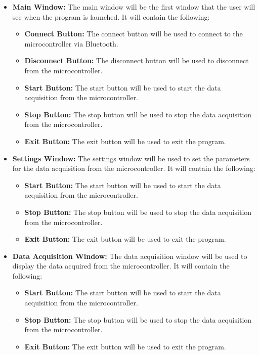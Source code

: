 \documentclass[12pt]{article}
\numberwithin{equation}{section}
\begin{document}
\begin{itemize}
  \item \textbf{Main Window:} The main window will be the first window that the user will see when the program is launched. It will contain the following:
  \begin{itemize}
    \item \textbf{Connect Button:} The connect button will be used to connect to the microcontroller via Bluetooth.
    \item \textbf{Disconnect Button:} The disconnect button will be used to disconnect from the microcontroller.
    \item \textbf{Start Button:} The start button will be used to start the data acquisition from the microcontroller.
    \item \textbf{Stop Button:} The stop button will be used to stop the data acquisition from the microcontroller.
    \item \textbf{Exit Button:} The exit button will be used to exit the program.
  \end{itemize}
  \item \textbf{Settings Window:} The settings window will be used to set the parameters for the data acquisition from the microcontroller. It will contain the following:
  \begin{itemize}
    \item \textbf{Start Button:} The start button will be used to start the data acquisition from the microcontroller.
    \item \textbf{Stop Button:} The stop button will be used to stop the data acquisition from the microcontroller.
    \item \textbf{Exit Button:} The exit button will be used to exit the program.
  \end{itemize}
  \item \textbf{Data Acquisition Window:} The data acquisition window will be used to display the data acquired from the microcontroller. It will contain the following:
  \begin{itemize}
    \item \textbf{Start Button:} The start button will be used to start the data acquisition from the microcontroller.
    \item \textbf{Stop Button:} The stop button will be used to stop the data acquisition from the microcontroller.
    \item \textbf{Exit Button:} The exit button will be used to exit the program.
  \end{itemize}
\end{itemize}
\end{document}
